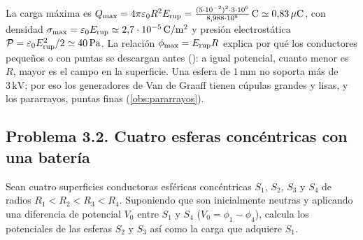 \begin{observacion}\label{obs:sem-globo}
La carga máxima es $Q_{\max}=4\pi\varepsilon_{0} R^{2}E_{\mathrm{rup}}=\frac{(5\cdot10^{-2})^{2}\cdot3\cdot10^{6}}{8{,}988\cdot10^{9}}\,\mathrm{C}\simeq0{,}83\,\mu\mathrm{C}$, con densidad
$\sigma_{\max}=\varepsilon_{0}E_{\mathrm{rup}}\simeq2{,}7\cdot10^{-5}\,\mathrm{C/m^{2}}$ y presión electrostática $\mathcal{P}=\varepsilon_{0}E_{\mathrm{rup}}^{2}/2\simeq40\,\mathrm{Pa}$. La relación
$\phi_{\max}=E_{\mathrm{rup}} R$ explica por qué los conductores pequeños o con puntas se descargan antes (): a igual potencial, cuanto menor es
$R$, mayor es el campo en la superficie. Una esfera de $1\,\mathrm{mm}$ no soporta más de $3\,\mathrm{kV}$; por eso los generadores de Van de Graaff tienen
cúpulas grandes y lisas, y los pararrayos, puntas finas (\cref{obs:pararrayos}).
\end{observacion}

\subsection{Problema 3.2. Cuatro esferas concéntricas con una batería}\label{sem:cuatro}
\begin{problema}\label{prob:cuatro}
Sean cuatro superficies conductoras esféricas concéntricas $S_1$, $S_2$, $S_3$ y $S_4$ de radios $R_1<R_2<R_3<R_4$. Suponiendo que son inicialmente neutras y
aplicando una diferencia de potencial $V_0$ entre $S_1$ y $S_4$ ($V_0=\phi_1-\phi_4$), calcula los potenciales de las esferas $S_2$ y $S_3$ así como la carga
que adquiere $S_1$.
\end{problema}

